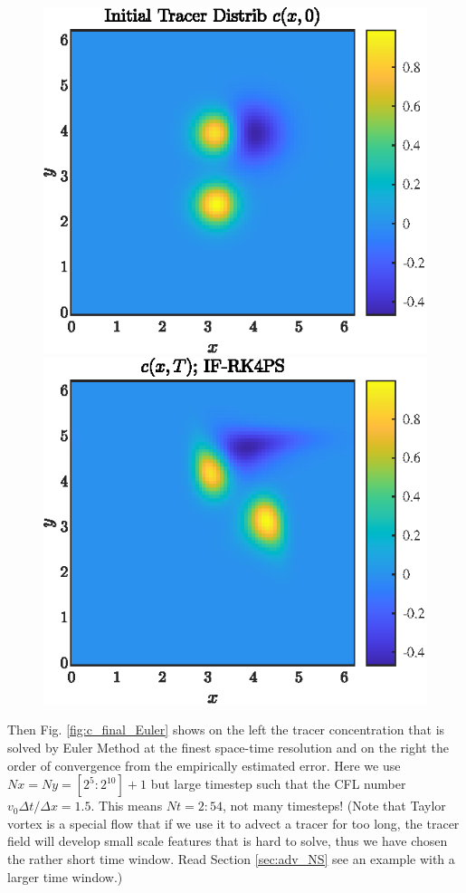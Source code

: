 \documentclass[11pt,letterpaper]{article}
\begin{document}
\begin{figure}[H]
    \centering
    \includegraphics{figs/c_init_IF-RK4PS}
    \includegraphics{figs/c_final_IF-RK4PS}
    \caption{}\label{fig:c_init_IF}
\end{figure}
Then Fig. \ref{fig:c_final_Euler} shows on the left the tracer concentration that is solved by Euler Method at the finest space-time resolution and on the right the order of convergence from the empirically estimated error. Here we use $Nx = Ny= [2^5:2^{10}]+1$ but large timestep such that the CFL number $v_0\Delta t/\Delta x = 1.5$. This means $Nt = 2:54$, not many timesteps! (Note that Taylor vortex is a special flow that if we use it to advect a tracer for too long, the tracer field will develop small scale features that is hard to solve, thus we have chosen the rather short time window. Read Section \ref{sec:adv_NS} see an example with a larger time window.)
\end{document}
